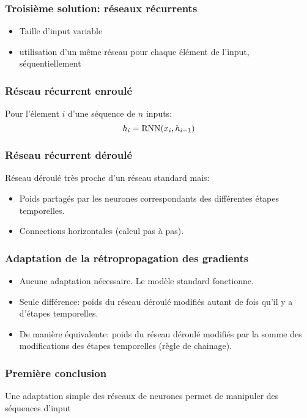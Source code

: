 \documentclass{formation}
\begin{document}
\begin{frame}
  \frametitle{Troisième solution: réseaux récurrents}
  \begin{itemize}
  \item Taille d'input variable
  \item utilisation d'un même réseau pour chaque élément de l'input,
    séquentiellement
  \end{itemize}
\end{frame}

\begin{frame}
  \frametitle{Réseau récurrent enroulé}
  Pour l'élement $i$ d'une séquence de $n$ inputs:
  \[
    h_i = \RNN(x_i, h_{i-1})
  \]
\end{frame}

\begin{frame}
  \frametitle{Réseau récurrent déroulé}
  Réseau déroulé très proche d'un réseau standard mais:
  \begin{itemize}
  \item Poids partagés par les neurones correspondants des différentes
    étapes temporelles.
  \item Connections horizontales (calcul pas à pas).
  \end{itemize}
  
\end{frame}

\begin{frame}
  \frametitle{Adaptation de la rétropropagation des gradients}

  \begin{itemize}
  \item Aucune adaptation nécessaire. Le modèle standard fonctionne.
  \item Seule différence: poids du réseau déroulé modifiés autant de
    fois qu'il y a d'étapes temporelles.
  \item De manière équivalente: poids du réseau déroulé modifiés par
    la somme des modifications des étapes temporelles (règle de
    chainage).
  \end{itemize}

\end{frame}

\begin{frame}
  \frametitle{Première conclusion}

  Une adaptation simple des réseaux de neurones permet de manipuler
  des séquences d'input

\end{frame}
\end{document}
